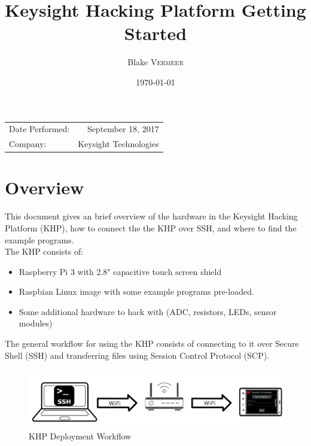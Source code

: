 \documentclass{article}
\title{Keysight Hacking Platform Getting Started} %
\author{Blake \textsc{Vermeer}} %
\date{\today} %
\begin{document}
\maketitle %

\begin{center}
\begin{tabular}{l r}
Date Performed: & September 18, 2017 \\ %
Company: & Keysight Technologies %
\end{tabular}
\end{center}


\section{Overview}

This document gives an brief overview of the hardware in the Keysight Hacking Platform (KHP), how to connect the the KHP over SSH, and where to find the example programs.   \\

The KHP consists of:

	\begin{itemize}
		
		\item Raspberry Pi 3 with 2.8" capacitive touch screen shield
		
		\item Raspbian Linux image with some example programs pre-loaded.
		
		\item Some additional hardware to hack with (ADC, resistors, LEDs, sensor modules)
		
	\end{itemize}

The general workflow for using the KHP consists of connecting to it over Secure Shell (SSH) and transferring files using Session Control Protocol (SCP).

	\begin{figure}[H]
		\centering
		\includegraphics[scale=0.5]{pics/Deployment_Workflow.png}
		\caption{KHP Deployment Workflow}
		\label{KHP_App_Deployment}
	\end{figure}
\end{document}
